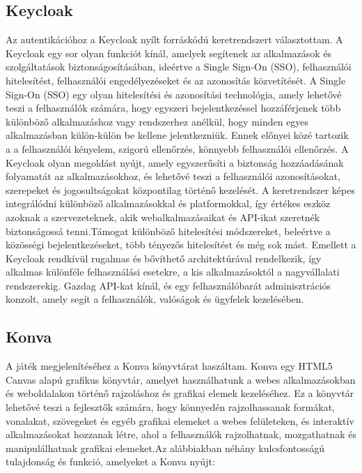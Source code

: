 \documentclass[a4paper,twoside]{article}
\begin{document}
\subsection{Keycloak}
Az autentikációhoz a Keycloak\cite{keycloak} nyílt forráskódú keretrendszert választottam. A Keycloak egy sor olyan funkciót kínál, amelyek segítenek az alkalmazások és szolgáltatások biztonságosításában, ideértve a Single Sign-On (SSO), felhasználói hitelesítést, felhasználói engedélyezéseket és az azonosítás közvetítését. A Single Sign-On (SSO) egy olyan hitelesítési és azonosítási technológia, amely lehetővé teszi a felhasználók számára, hogy egyszeri bejelentkezéssel hozzáférjenek több különböző alkalmazáshoz vagy rendszerhez anélkül, hogy minden egyes alkalmazásban külön-külön be kellene jelentkezniük. Ennek előnyei közé tartozik a a felhasználói kényelem, szigorú ellenőrzés, könnyebb felhasználói ellenőrzés. A Keycloak olyan megoldást nyújt, amely egyszerűsíti a biztonság hozzáadásának folyamatát az alkalmazásokhoz, és lehetővé teszi a felhasználói azonosításokat, szerepeket és jogosultságokat központilag történő kezelését. A keretrendszer képes integrálódni különböző alkalmazásokkal és platformokkal, így értékes eszköz azoknak a szervezeteknek, akik webalkalmazásaikat és API-ikat szeretnék biztonságossá tenni.Támogat különböző hitelesítési módszereket, beleértve a közösségi bejelentkezéseket, több tényezős hitelesítést és még sok mást. Emellett a Keycloak rendkívül rugalmas és bővíthető architektúrával rendelkezik, így alkalmas különféle felhasználási esetekre, a kis alkalmazásoktól a nagyvállalati rendszerekig. Gazdag API-kat kínál, és egy felhasználóbarát adminisztrációs konzolt, amely segít a felhasználók, valóságok és ügyfelek kezelésében.


\subsection{Konva}
A játék megjelenítéséhez a Konva\cite{konva} könyvtárat haszáltam. Konva egy HTML5 Canvas alapú grafikus könyvtár, amelyet használhatunk a webes alkalmazásokban és weboldalakon történő rajzoláshoz és grafikai elemek kezeléséhez. Ez a könyvtár lehetővé teszi a fejlesztők számára, hogy könnyedén rajzolhassanak formákat, vonalakat, szövegeket és egyéb grafikai elemeket a webes felületeken, és interaktív alkalmazásokat hozzanak létre, ahol a felhasználók rajzolhatnak, mozgathatnak és manipulálhatnak grafikai elemeket.Az alábbiakban néhány kulcsfontosságú tulajdonság és funkció, amelyeket a Konva nyújt:
\end{document}
